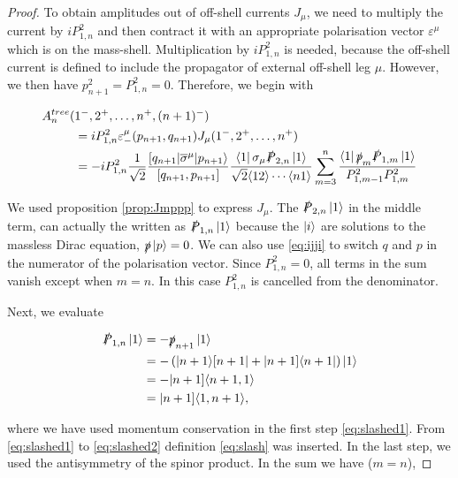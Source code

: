 \documentclass{article}
\theoremstyle{definition}
\numberwithin{equation}{section}
\begin{document}
\begin{proof}
To obtain amplitudes out of off-shell currents $J_{\mu}$, we need to multiply the current by $i P_{1,n}^2$ and then contract it with an appropriate polarisation vector $\varepsilon^{\mu}$ which is on the mass-shell. Multiplication by $i P_{1,n}^2$ is needed, because the off-shell current is defined to include the propagator of external off-shell leg $\mu$. However, we then have $p_{n+1}^2 = P_{1,n}^2 = 0$. Therefore, we begin with

\begin{align}
    A_n^{tree}(&1^{-}, 2^{+}, \dots , n^{+}, (n+1)^{-}) \\
    &= i P_{1,n}^2 \varepsilon_{-}^{\mu}(p_{n+1}, q_{n+1}) J_{\mu}(1^{-}, 2^{+}, \dots , n^{+}) \\
    &= - i P_{1,n}^2 \frac{1}{\sqrt{2}} \frac{ \lbrack q_{n+1} | \overline{\sigma}^{\mu} | p_{n+1} \rangle }{ \lbrack q_{n+1}, p_{n+1} \rbrack } \frac{ \bra{1} \sigma_{\mu} \slashed{P}_{2,n} \ket{1} }{ \sqrt{2} \langle 12 \rangle \cdots \langle n1 \rangle } \sum_{m=3}^{n} \frac{ \bra{1} \slashed{p}_m \slashed{P}_{1,m} \ket{1} }{ P_{1,m-1}^2 P_{1,m}^2 }
\end{align}

We used proposition \ref{prop:Jmppp} to express $J_{\mu}$. The $\slashed{P}_{2,n} \ket{1}$ in the middle term, can actually the written as $\slashed{P}_{1,n} \ket{1}$ because the $\ket{i}$ are solutions to the massless Dirac equation, $\slashed{p} \ket{p} = 0$. We can also use \eqref{eq:ijji} to switch $q$ and $p$ in the numerator of the polarisation vector. Since $P_{1,n}^2 = 0$, all terms in the sum vanish except when $m=n$. In this case $P_{1,n}^2$ is cancelled from the denominator.

Next, we evaluate

\begin{align}
    \slashed{P}_{1,n} \ket{1} &= - \slashed{p}_{n+1} \ket{1} \label{eq:slashed1} \\
    &= - \left( | n+1 \rangle \lbrack n+1 | + | n+1 \rbrack \langle n+1 | \right) \ket{1} \label{eq:slashed2} \\
    &= - | n+1 \rbrack \langle n+1,1 \rangle \label{eq:slashed3} \\
    &= | n+1 \rbrack \langle 1,n+1 \rangle, \label{eq:slashed4}
\end{align}

where we have used momentum conservation in the first step \eqref{eq:slashed1}. From \eqref{eq:slashed1} to \eqref{eq:slashed2} definition \eqref{eq:slash} was inserted. In the last step, we used the antisymmetry of the spinor product. In the sum we have ($m=n$),


\end{proof}
\end{document}
